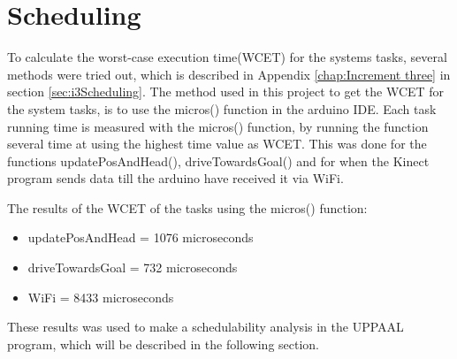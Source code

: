 \section{Scheduling}
\label{sec:Scheduling implementation}
To calculate the worst-case execution time(WCET) for the systems tasks, several methods were tried out, which is described in Appendix \ref{chap:Increment three} in section \ref{sec:i3Scheduling}. 
The method used in this project to get the WCET for the system tasks, is to use the micros() function in the arduino IDE. \newline
Each task running time is measured with the micros() function, by running the function several time at using the highest time value as WCET. This was done for the functions updatePosAndHead(), driveTowardsGoal() and for when the Kinect program sends data till the arduino have received it via WiFi.

The results of the WCET of the tasks using the micros() function:
\begin{itemize}
	\item updatePosAndHead = 1076 microseconds
	\item driveTowardsGoal = 732 microseconds
	\item WiFi = 8433 microseconds
\end{itemize}
These results was used to make a schedulability analysis in the UPPAAL program, which will be described in the following section.
